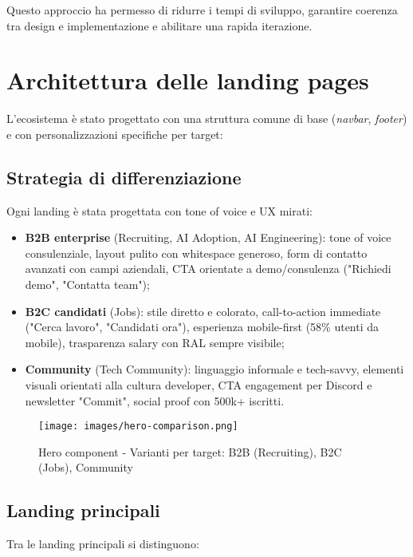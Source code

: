 Questo approccio ha permesso di ridurre i tempi di sviluppo, garantire coerenza tra design e implementazione e abilitare una rapida iterazione.

\section{Architettura delle landing pages}
L'ecosistema è stato progettato con una struttura comune di base
(\textit{navbar}, \textit{footer}) e con
personalizzazioni specifiche per target:

\subsection{Strategia di differenziazione}
Ogni landing è stata progettata con tone of voice e UX mirati:

\begin{itemize}
  \item \textbf{B2B enterprise} (Recruiting, AI Adoption, AI Engineering): tone of voice 
  consulenziale, layout pulito con whitespace generoso, form di contatto avanzati con 
  campi aziendali, CTA orientate a demo/consulenza ("Richiedi demo", "Contatta team");
  
  \item \textbf{B2C candidati} (Jobs): stile diretto e colorato, call-to-action
  immediate ("Cerca lavoro", "Candidati ora"), esperienza mobile-first (58\% utenti 
  da mobile), trasparenza salary con RAL sempre visibile;
  
  \item \textbf{Community} (Tech Community): linguaggio informale e tech-savvy, elementi 
  visuali orientati alla cultura developer, CTA engagement per Discord e newsletter 
  "Commit", social proof con 500k+ iscritti.
\end{itemize}

\begin{figure}[h]
  \centering
  \texttt{[image: images/hero-comparison.png]}
  \caption{Hero component - Varianti per target: B2B (Recruiting), B2C (Jobs), Community}
  \label{fig:hero-variants}
\end{figure}

\subsection{Landing principali}
Tra le landing principali si distinguono:

